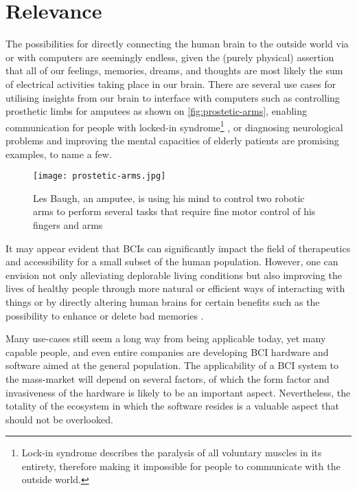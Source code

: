 \section{Relevance}
\label{chapter1-relevance}

The possibilities for directly connecting the human brain to the outside world via or with computers are seemingly endless, given the (purely physical) assertion that all of our feelings, memories, dreams, and thoughts are most likely the sum of electrical activities taking place in our brain. There are several use cases for utilising insights from our brain to interface with computers such as controlling prosthetic limbs for amputees as shown on \autoref{fig:prostetic-arms}, enabling communication for people with locked-in syndrome\footnote{Lock-in syndrome describes the paralysis of all voluntary muscles in its entirety, therefore making it impossible for people to communicate with the outside world.} \citep{chaudhary_spelling_2022}, or diagnosing neurological problems and improving the mental capacities of elderly patients \citep{belkacem_brain_2020} are promising examples, to name a few.

\begin{figure}[ht]
  \centering
  \texttt{[image: prostetic-arms.jpg]}
  \caption{Les Baugh, an amputee, is using his mind to control two robotic arms to perform several tasks that require fine motor control of his fingers and arms \citep{campbell_amputee_2014}}
  \label{fig:prostetic-arms}
\end{figure}

It may appear evident that BCIs can significantly impact the field of therapeutics and accessibility for a small subset of the human population. However, one can envision not only alleviating deplorable living conditions but also improving the lives of healthy people through more natural or efficient ways of interacting with things or by directly altering human brains for certain benefits such as the possibility to enhance or delete bad memories \citep{spiers_enhance_2014}.

Many use-cases still seem a long way from being applicable today, yet many capable people, and even entire companies are developing BCI hardware and software aimed at the general population. The applicability of a BCI system to the mass-market will depend on several factors, of which the form factor and invasiveness of the hardware is likely to be an important aspect. Nevertheless, the totality of the ecosystem in which the software resides is a valuable aspect that should not be overlooked.

